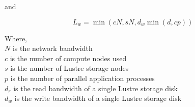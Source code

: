 \documentclass[10pt,journal,compsoc]{IEEEtran}
\begin{document}
    and


    \begin{equation}%
        L_{w} = \min{(cN, sN, d_{w}\min{(d, cp)})}
    \end{equation}

    {\noindent} Where, \\
    $N$ is the network bandwidth \\
    $c$ is the number of compute nodes used \\
    $s$ is the number of Lustre storage nodes \\
    $p$ is the number of parallel application processes \\
    $d_{r}$ is the read bandwidth of a single Lustre storage disk \\
    $d_{w}$ is the write bandwidth of a single Lustre storage disk \\





\end{document}

